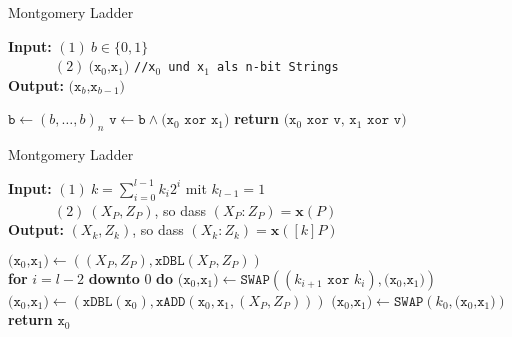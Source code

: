 \begin{frame}{Montgomery Ladder}
    \begin{algorithm}[H]
        \caption{\textbf{\texttt{SWAP()}} – Bedingter Tausch in konstanter Zeit}
        
        \textbf{Input:} $(1) \ b \in \{0,1\}$\\
        \text{} $\quad \quad \quad \; (2) \ \texttt{(x$_0$,x$_1$)}$ \hfill \texttt{//x$_0$ und x$_1$ als n-bit Strings} \\
        \textbf{Output:} $\texttt{(x$_b$,x$_{b-1}$)}$
        
        \begin{algorithmic}[1]  
            \State \hspace{0.5cm} $\texttt{b} \gets (b,\dots,b)_n$
            \State \hspace{0.5cm} $\texttt{v} \gets \texttt{b}\land\texttt{(x$_0$ xor x$_1$)}$
            \State \textbf{return} $\texttt{(x$_0$ xor v, x$_1$ xor v)}$
        \end{algorithmic}
    \end{algorithm}    
\end{frame}

\begin{frame}{Montgomery Ladder}
    \begin{algorithm}[H]
        \caption{\textbf{Algorithmus: Montgomery Ladder mit \texttt{SWAP()}}}
        
        
        \textbf{Input:} $(1)\ k=\sum\nolimits_{i=0}^{l-1}k_i2^i$ mit $k_{l-1}=1$  \\ 
        \text{} $\quad \quad \quad \; (2)\ (X_P,Z_P)$, so dass $(X_P:Z_P)=\textbf{x}(P)$ \\
        \textbf{Output:} $(X_k,Z_k)$, so dass $(X_k:Z_k)=\textbf{x}([k]P)$
        
        \begin{algorithmic}[1]
            \State $\texttt{(x$_0$,x$_1$)} \gets ((X_P, Z_P), \texttt{xDBL}(X_P, Z_P))$ \\
            \textbf{for} $i = l-2$ \textbf{downto} 0 \textbf{do}
            \State \quad $\texttt{(x$_0$,x$_1$)} \gets \texttt{SWAP}((k_{i+1} \texttt{ xor } k_i),\texttt{(x$_0$,x$_1$)})$
            \State \quad $\texttt{(x$_0$,x$_1$)} \gets (\texttt{xDBL}(\texttt{x$_0$}),\texttt{xADD}(\texttt{x$_0$},\texttt{x$_1$},(X_P,Z_P)))$
            \State $\texttt{(x$_0$,x$_1$)} \gets \texttt{SWAP}(k_0,\texttt{(x$_0$,x$_1$)})$
            \State \textbf{return} $\texttt{x$_0$}$ 
            
         
        \end{algorithmic}
    \end{algorithm}
    
\end{frame}
